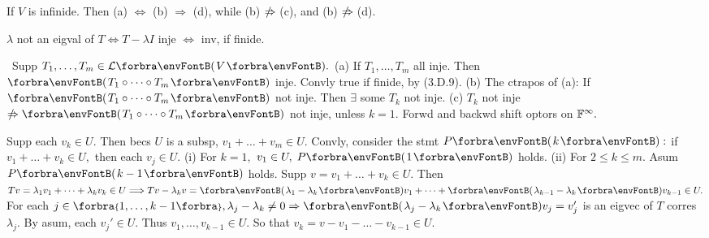 \BulletPointX\NoteForSmall{[5.6]}\;\;If $V$ is infinide. Then (a) $\Longleftrightarrow$ (b) $\Rightarrow$ (d), while (b) $\notRightarrow$(c), and (b) $\notRightarrow$(d).\par
\BulletPointX\AComm $\lambda$ not an eigval of $T\Longleftrightarrow{T-\lambda I}$ inje $\Longleftrightarrow$ inv, if finide.
\SepLine

\BulletPointX\Tips \,\,\,Supp $T_1,\dots,T_m\in\Lm{V}.$\TextB{\vspace{-2pt}}
(a) If $T_1,\dots,T_m$ all inje. Then $\Par{T_1\circ\cdots\circ T_m}$ inje. \;Convly true if finide, by (3.D.9).\TextB{}
(b) The ctrapos of (a): If $\Par{T_1\circ\cdots\circ T_m}$ not inje. Then $\exists$ some $T_k$ not inje.\TextB{}
(c)  \;$T_k$ not inje $\notRightarrow\Par{T_1\circ\cdots\circ T_m}$ not inje, unless $k=1$.\TextB{}
\Hc\AExa Forwd and backwd shift optors on ${\mathbb{F}}^\infty.$
\SepLine

\parSol{}
\SepLine

Supp each $v_k\in U.$ Then becs $U$ is a subsp, $v_1+\dots+v_m\in U.$\parSol{}
Convly, consider the stmt $P\Par{k}:$ if $v_1+\dots+v_k\in U,$ then each $v_j\in U.$\parSol{}
(i) For $k=1,$ $v_1\in U,\;P\Par{1}$ holds.\parSol{\Endi}
(ii) For $2\leqslant k\leqslant m.$ Asum $P\Par{k-1}$ holds. Supp $v=v_1+\dots+v_k\in U.$\parSol{\Hii}
Then $Tv=\lambda_1v_1+\dots+\lambda_k v_k\in U\Longrightarrow Tv-\lambda_k v=\Par{\lambda_1-\lambda_k}v_1+\dots+\Par{\lambda_{k-1}-\lambda_k}v_{k-1}\in U.$\parSol{\Hii}
For each $j\in\Bra{1,\dots,k-1},\lambda_j-\lambda_{k}\neq 0\Rightarrow\Par{\lambda_j-\lambda_k}v_j=v_j'$ is an eigvec of $T$ corres $\lambda_j.$\parSol{\Hii}
By asum, each $v_j'\in U.$ Thus $v_1,\dots,v_{k-1}\in U.$ So that $v_k=v-v_1-\dots-v_{k-1}\in U.$\PfEnd
\SepLine[0pt][\Blind{\BulletPointX} ]

